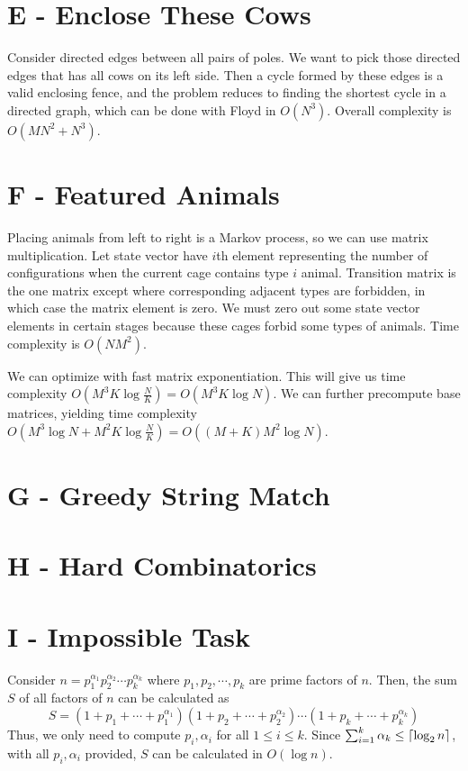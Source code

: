 \documentclass{article}
\DeclarePairedDelimiter\ceil{\lceil}{\rceil}
\begin{document}
\section*{E - Enclose These Cows}
Consider directed edges between all pairs of poles. We want to pick those directed edges that has all cows on its left side. Then a cycle formed by these edges is a valid enclosing fence, and the problem reduces to finding the shortest cycle in a directed graph, which can be done with Floyd in $O(N^3)$. Overall complexity is $O(M N^2 + N^3)$. 

\section*{F - Featured Animals}

Placing animals from left to right is a Markov process, so we can use matrix multiplication. Let state vector have $i$th element representing the number of configurations when the current cage contains type $i$ animal. Transition matrix is the one matrix except where corresponding adjacent types are forbidden, in which case the matrix element is zero. We must zero out some state vector elements in certain stages because these cages forbid some types of animals. Time complexity is $O(N M^2)$. 

We can optimize with fast matrix exponentiation. This will give us time complexity $O(M^3 K \log{\frac{N}{K}}) = O(M^3 K \log{N})$. We can further precompute base matrices, yielding time complexity $O(M^3 \log{N} + M^2 K \log{\frac{N}{K}}) = O((M+K) M^2 \log{N})$. 

\section*{G - Greedy String Match}



\section*{H - Hard Combinatorics}



\section*{I - Impossible Task}
Consider $n = p_1^{\alpha_1}p_2^{\alpha_2}\cdots p_k^{\alpha_k}$ where $p_1, p_2, \cdots, p_k$ are prime factors of $n$.
Then, the sum $S$ of all factors of $n$ can be calculated as
\begin{equation}
S = \left(1 + p_1 + \cdots + p_1^{\alpha_1}\right)\left(1 + p_2 + \cdots + p_2^{\alpha_2}\right)\cdots\left(1 + p_k + \cdots + p_k^{\alpha_k}\right)
\end{equation}
Thus, we only need to compute $p_i, \alpha_i$ for all $1 \leq i \leq k$. Since $\sum_{i = 1}^k \alpha_k \leq \ceil{\log_2{n}}$, with
all $p_i, \alpha_i$ provided, $S$ can be calculated in $O(\log{n})$.\\
\end{document}
